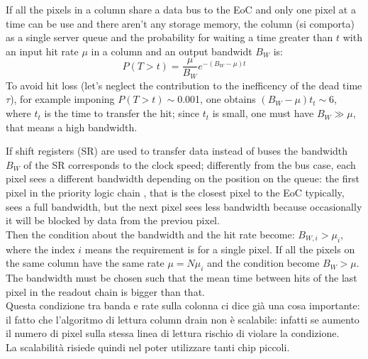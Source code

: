    If all the pixels in a column share a data bus to the EoC and only one pixel at a time can
   be use and there aren't any storage memory, the column (si comporta) as a single
   server queue and the probability for waiting a time greater than $t$ with an input
   hit rate $\mu$ in a column and an output bandwidt $B_W$ is:
   \begin{equation}
   P(T > t) = \frac{\mu}{B_W} e^{-( B_W-\mu )t}
   \end{equation}
   To avoid hit loss (let's neglect the contribution to the inefficency of the dead
   time $\tau$), for example imponing $P(T > t)\sim$0.001, one obtains
   $(B_W -\mu)t_t\sim$6, where $t_t$ is the time to transfer the hit;
   since $t_t$ is small, one must have $B_W \gg \mu$, that means a high bandwidth.

   If shift registers (SR) are used to transfer data instead of buses the bandwidth $B_W$
   of the SR corresponds to the clock speed; differently from the bus case, each pixel
   sees a different bandwidth depending on the position on the queue: the first pixel
   in the priority logic chain , that is the closest pixel to the EoC typically,
   sees a full bandwidth, but the next pixel sees less bandwidth because
   occasionally it will be blocked by data from the previou pixel.\\
   Then the condition about the bandwidth and the hit rate become: $B_{W,i} > \mu_{i}$,
   where the index $i$ means the requirement is for a single pixel. If all the pixels
   on the same column
   have the same rate $\mu = N\mu_{i}$ and the condition become $B_{W} > \mu$.
   The bandwidth must be chosen such that the mean time between hits of the last pixel
   in the readout chain is bigger than that.\\
   Questa condizione tra banda e rate sulla colonna ci dice già una cosa importante:
   il fatto che l'algoritmo di lettura column drain non è scalabile: infatti se aumento
   il numero di pixel sulla stessa linea di lettura rischio di violare la condizione.\\
   La scalabilità risiede quindi nel poter utilizzare tanti chip piccoli.\\



